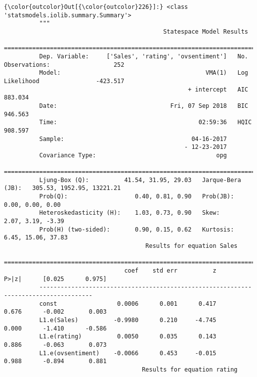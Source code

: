 \documentclass[11pt]{article}
\begin{document}
\begin{Verbatim}[commandchars=\\\{\}]
{\color{outcolor}Out[{\color{outcolor}226}]:} <class 'statsmodels.iolib.summary.Summary'>
          """
                                             Statespace Model Results                                   
          ==============================================================================================
          Dep. Variable:     ['Sales', 'rating', 'ovsentiment']   No. Observations:                  252
          Model:                                         VMA(1)   Log Likelihood                -423.517
                                                    + intercept   AIC                            883.034
          Date:                                Fri, 07 Sep 2018   BIC                            946.563
          Time:                                        02:59:36   HQIC                           908.597
          Sample:                                    04-16-2017                                         
                                                   - 12-23-2017                                         
          Covariance Type:                                  opg                                         
          ===========================================================================================
          Ljung-Box (Q):          41.54, 31.95, 29.03   Jarque-Bera (JB):   305.53, 1952.95, 13221.21
          Prob(Q):                   0.40, 0.81, 0.90   Prob(JB):                    0.00, 0.00, 0.00
          Heteroskedasticity (H):    1.03, 0.73, 0.90   Skew:                       2.07, 3.19, -3.39
          Prob(H) (two-sided):       0.90, 0.15, 0.62   Kurtosis:                  6.45, 15.06, 37.83
                                        Results for equation Sales                             
          =====================================================================================
                                  coef    std err          z      P>|z|      [0.025      0.975]
          -------------------------------------------------------------------------------------
          const                 0.0006      0.001      0.417      0.676      -0.002       0.003
          L1.e(Sales)          -0.9980      0.210     -4.745      0.000      -1.410      -0.586
          L1.e(rating)          0.0050      0.035      0.143      0.886      -0.063       0.073
          L1.e(ovsentiment)    -0.0066      0.453     -0.015      0.988      -0.894       0.881
                                       Results for equation rating                             

\end{Verbatim}
\end{document}
